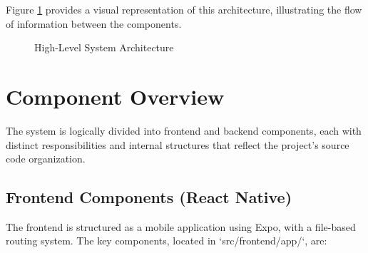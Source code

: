 Figure \ref{fig:high-level-arch} provides a visual representation of this architecture, illustrating the flow of information between the components.

\begin{figure}[h!]
    \centering
    \caption{High-Level System Architecture}
    \label{fig:high-level-arch}
\end{figure}

\section{Component Overview}

The system is logically divided into frontend and backend components, each with distinct responsibilities and internal structures that reflect the project's source code organization.

\subsection{Frontend Components (React Native)}
The frontend is structured as a mobile application using Expo, with a file-based routing system. The key components, located in `src/frontend/app/`, are:


